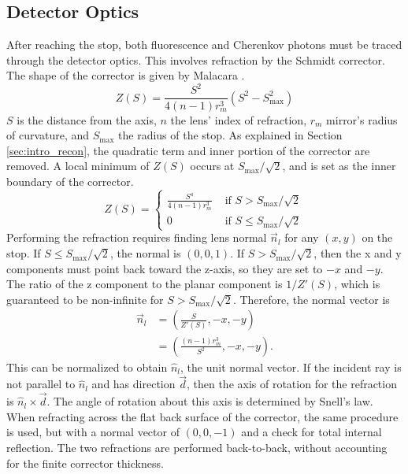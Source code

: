 \subsection{Detector Optics} \label{sec:optics}

After reaching the stop, both fluorescence and Cherenkov photons must be traced through the detector optics. This involves refraction by the Schmidt corrector. The shape of the corrector is given by Malacara \cite{malacara2004optics}.
\begin{equation}
    Z(S) = \frac{S^2}{4(n - 1)r_m^3}(S^2 - S_\text{max}^2)
\end{equation}
$S$ is the distance from the axis, $n$ the lens' index of refraction, $r_m$ mirror's radius of curvature, and $S_\text{max}$ the radius of the stop. As explained in Section \ref{sec:intro_recon}, the quadratic term and inner portion of the corrector are removed. A local minimum of $Z(S)$ occurs at $S_\text{max} / \sqrt{2}$, and is set as the inner boundary of the corrector.
\begin{equation}
Z(S)=
    \begin{cases}
    \frac{S^4}{4(n - 1)r_m^3} & \text{ if } S > S_\text{max} / \sqrt{2} \\
    0 & \text{ if } S \leq S_\text{max} / \sqrt{2}
    \end{cases}
\end{equation}
Performing the refraction requires finding lens normal $\vec{n}_l$ for any $(x, y)$ on the stop. If $S \leq S_\text{max} / \sqrt{2}$, the normal is $(0, 0, 1)$. If $S > S_\text{max} / \sqrt{2}$, then the x and y components must point back toward the z-axis, so they are set to $-x$ and $-y$. The ratio of the z component to the planar component is $1 / Z'(S)$, which is guaranteed to be non-infinite for $S > S_\text{max} / \sqrt{2}$. Therefore, the normal vector is
\begin{equation}
\begin{aligned}
\vec{n}_l &= \left(\frac{S}{Z'(S)}, -x, -y\right) \\
          &= \left(\frac{(n - 1)r_m^3}{S^2}, -x, -y\right).
\end{aligned}
\end{equation}
This can be normalized to obtain $\hat{n}_l$, the unit normal vector. If the incident ray is not parallel to $\hat{n}_l$ and has direction $\vec{d}$, then the axis of rotation for the refraction is $\hat{n}_l \times \vec{d}$. The angle of rotation about this axis is determined by Snell's law. When refracting across the flat back surface of the corrector, the same procedure is used, but with a normal vector of $(0, 0, -1)$ and a check for total internal reflection. The two refractions are performed back-to-back, without accounting for the finite corrector thickness.

